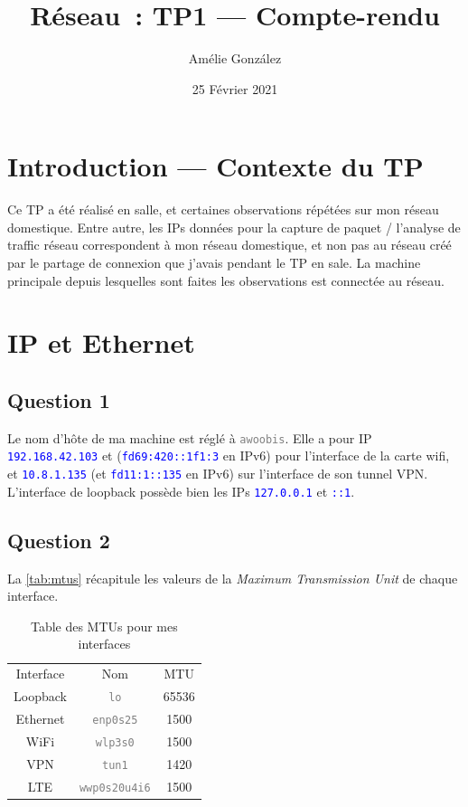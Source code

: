 \documentclass[a4paper,10pt]{article}
\title{Réseau~: TP1 --- Compte-rendu}
\author{Amélie González}
\date{25 Février 2021}
\newcommand{\codeword}[1]{\texttt{\textcolor{gray}{#1}}}
\newcommand{\blueword}[1]{\texttt{\textcolor{blue}{#1}}}
\begin{document}
\maketitle
\tableofcontents

\section*{Introduction --- Contexte du TP}

Ce TP a été réalisé en salle, et certaines observations répétées sur mon réseau domestique. Entre autre, les IPs données pour la capture de paquet / l'analyse de traffic réseau correspondent à mon réseau domestique, et non pas au réseau créé par le partage de connexion que j'avais pendant le TP en sale. La machine principale depuis lesquelles sont faites les observations est connectée au réseau.

\section{IP et Ethernet}

\subsection{Question 1}

Le nom d'hôte de ma machine est réglé à \codeword{awoobis}.
Elle a pour IP \blueword{192.168.42.103} et (\blueword{fd69:420::1f1:3} en IPv6) pour l'interface de la carte wifi, et \blueword{10.8.1.135} (et \blueword{fd11:1::135} en IPv6) sur l'interface de son tunnel VPN. L'interface de loopback possède bien les IPs \blueword{127.0.0.1} et \blueword{::1}.

\subsection{Question 2}

La \autoref{tab:mtus} récapitule les valeurs de la \textit{Maximum Transmission Unit} de chaque interface.

\begin{table}[ht]
\centering
\begin{tabular}{|c|c|c|}
\bottomrule
Interface & Nom & MTU \\
Loopback & \codeword{lo} & 65536\\
Ethernet & \codeword{enp0s25} & 1500\\
WiFi & \codeword{wlp3s0} & 1500\\
VPN & \codeword{tun1} & 1420\\
LTE & \codeword{wwp0s20u4i6} & 1500\\\toprule
\end{tabular}
\caption{Table des MTUs pour mes interfaces}
\label{tab:mtus}
\end{table}
\end{document}
